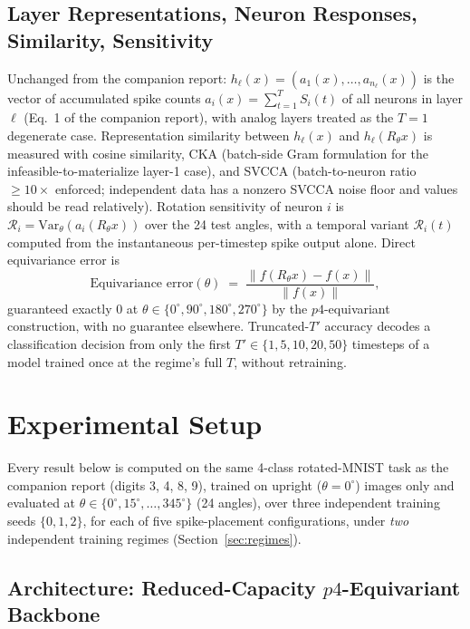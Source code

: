 \documentclass[11pt]{article}
\begin{document}
\subsection{Layer Representations, Neuron Responses, Similarity, Sensitivity}

Unchanged from the companion report: $h_\ell(x) = (a_1(x), \ldots, a_{n_\ell}(x))$ is the vector of
accumulated spike counts $a_i(x) = \sum_{t=1}^T S_i(t)$ of all neurons in layer $\ell$ (Eq.~1 of the
companion report), with analog layers treated as the $T=1$ degenerate case. Representation similarity
between $h_\ell(x)$ and $h_\ell(R_\theta x)$ is measured with cosine similarity, CKA (batch-side Gram
formulation for the infeasible-to-materialize layer-1 case), and SVCCA (batch-to-neuron ratio $\geq
10\times$ enforced; independent data has a nonzero SVCCA noise floor and values should be read
relatively). Rotation sensitivity of neuron $i$ is $\mathcal{R}_i = \mathrm{Var}_\theta(a_i(R_\theta
x))$ over the 24 test angles, with a temporal variant $\mathcal{R}_i(t)$ computed from the
instantaneous per-timestep spike output alone. Direct equivariance error is
\[
\text{Equivariance error}(\theta) \;=\; \frac{\|f(R_\theta x) - f(x)\|}{\|f(x)\|},
\]
guaranteed exactly 0 at $\theta \in \{0^\circ, 90^\circ, 180^\circ, 270^\circ\}$ by the $p4$-equivariant
construction, with no guarantee elsewhere. Truncated-$T'$ accuracy decodes a classification decision
from only the first $T' \in \{1,5,10,20,50\}$ timesteps of a model trained once at the regime's full
$T$, without retraining.

\section{Experimental Setup}
\label{sec:setup}

\begin{keypoint}
Every result below is computed on the same 4-class rotated-MNIST task as the companion report
(digits 3, 4, 8, 9), trained on upright ($\theta=0^\circ$) images only and evaluated at
$\theta \in \{0^\circ, 15^\circ, \ldots, 345^\circ\}$ (24 angles), over three independent training
seeds $\{0,1,2\}$, for each of five spike-placement configurations, under \emph{two} independent
training regimes (Section~\ref{sec:regimes}).
\end{keypoint}

\subsection{Architecture: Reduced-Capacity $p4$-Equivariant Backbone}
\label{sec:arch}
\end{document}
